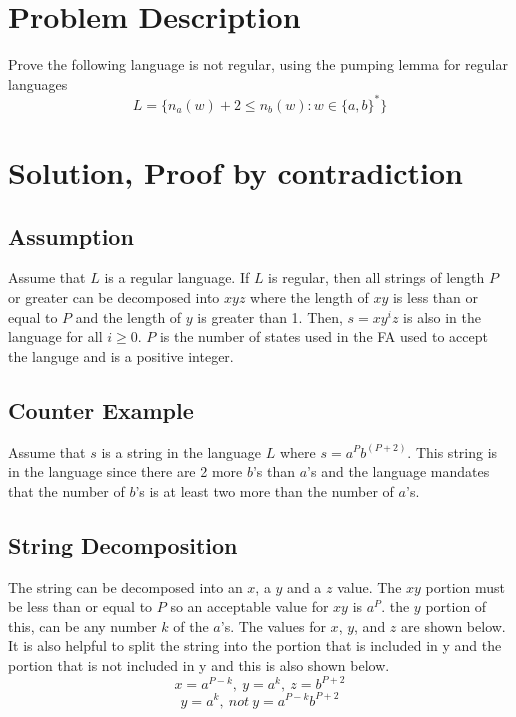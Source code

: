 \documentclass{assignment-x}
\begin{document}
\maketitle
\pagebreak

\section{Problem Description}
Prove the following language is not regular, using the pumping lemma for regular languages
$$L = \{n_a(w)+2 \leq n_b(w): w \in \{a,b\}^*\}$$

\section{Solution, Proof by contradiction}
\subsection{Assumption}
Assume that $L$ is a regular language. If $L$ is regular, then all strings of length $P$ or greater can be decomposed into $xyz$ where the length of $xy$ is less than or equal to $P$ and the length of $y$ is greater than 1. Then, $s=xy^iz$ is also in the language for all $i \geq 0$. $P$ is the number of states used in the FA used to accept the languge and is a positive integer.

\subsection{Counter Example}
Assume that $s$ is a string in the language $L$ where $s = a^P b^{(P+2)}$. This string is in the language since there are 2 more $b$'s than $a$'s and the language mandates that the number of $b$'s is at least two more than the number of $a$'s.

\subsection{String Decomposition}
The string can be decomposed into an $x$, a $y$ and a $z$ value. The $xy$ portion must be less than or equal to $P$ so an acceptable value for $xy$ is $a^P$. the $y$ portion of this, can be any number $k$ of the $a$'s. The values for $x$, $y$, and $z$ are shown below. It is also helpful to split the string into the portion that is included in y and the portion that is not included in y and this is also shown below.
\[ x=a^{P-k},\ y=a^k,\ z=b^{P+2}\]
\[y = a^k,\ not\ y = a^{P-k}b^{P+2} \]
\end{document}
